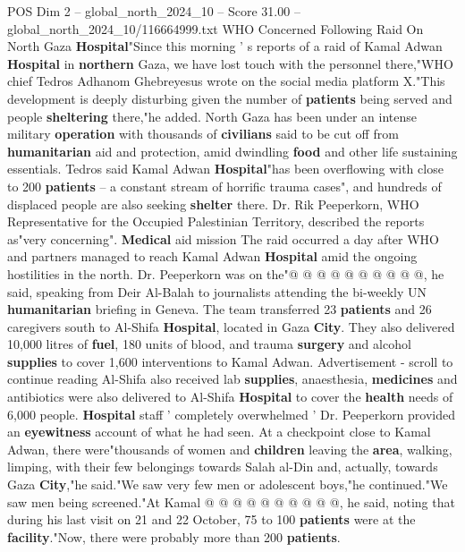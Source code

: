 \begin{textsample}{POS Dim 2 – global\_north\_2024\_10 – Score 31.00 – global\_north\_2024\_10/116664999.txt}  \label{ex:f2_pos_342}
WHO Concerned Following Raid On North Gaza \textbf{Hospital}"Since this morning ' s reports of a raid of Kamal Adwan \textbf{Hospital} in \textbf{northern} Gaza, we have lost touch with the personnel there,"WHO chief Tedros Adhanom Ghebreyesus wrote on the social media platform X."This development is deeply disturbing given the number of \textbf{patients} being served and people \textbf{sheltering} there,"he added.
North Gaza has been under an intense military \textbf{operation} with thousands of \textbf{civilians} said to be cut off from \textbf{humanitarian} aid and protection, amid dwindling \textbf{food} and other life sustaining essentials.
Tedros said Kamal Adwan \textbf{Hospital}"has been overflowing with close to 200 \textbf{patients} -- a constant stream of horrific trauma cases", and hundreds of displaced people are also seeking \textbf{shelter} there.
Dr.
Rik Peeperkorn, WHO Representative for the Occupied Palestinian Territory, described the reports as"very concerning". \textbf{Medical} aid mission The raid occurred a day after WHO and partners managed to reach Kamal Adwan \textbf{Hospital} amid the ongoing hostilities in the north.
Dr.
Peeperkorn was on the"@ @ @ @ @ @ @ @ @ @, he said, speaking from Deir Al-Balah to journalists attending the bi-weekly UN \textbf{humanitarian} briefing in Geneva.
The team transferred 23 \textbf{patients} and 26 caregivers south to Al-Shifa \textbf{Hospital}, located in Gaza \textbf{City}.
They also delivered 10,000 litres of \textbf{fuel}, 180 units of blood, and trauma \textbf{surgery} and alcohol \textbf{supplies} to cover 1,600 interventions to Kamal Adwan.
Advertisement - scroll to continue reading Al-Shifa also received lab \textbf{supplies}, anaesthesia, \textbf{medicines} and antibiotics were also delivered to Al-Shifa \textbf{Hospital} to cover the \textbf{health} needs of 6,000 people. \textbf{Hospital} staff ' completely overwhelmed ' Dr.
Peeperkorn provided an \textbf{eyewitness} account of what he had seen.
At a checkpoint close to Kamal Adwan, there were"thousands of women and \textbf{children} leaving the \textbf{area}, walking, limping, with their few belongings towards Salah al-Din and, actually, towards Gaza \textbf{City},"he said."We saw very few men or adolescent boys,"he continued."We saw men being screened."At Kamal @ @ @ @ @ @ @ @ @ @, he said, noting that during his last visit on 21 and 22 October, 75 to 100 \textbf{patients} were at the \textbf{facility}."Now, there were probably more than 200 \textbf{patients}.

\end{textsample}
